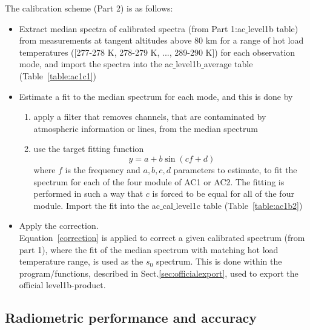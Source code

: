 The calibration scheme (Part 2) is as follows:
\begin{itemize}
\item Extract median spectra of calibrated spectra 
(from Part 1:ac\underline{ }level1b table) 
from measurements at tangent altitudes above 80 km for a range of hot load 
temperatures ([277-278 K, 278-279 K, ..., 289-290 K]) 
for each observation mode, and import the spectra
into the ac\underline{ }level1b\underline{ }average table
(Table~\ref{table:ac1c1})
\item Estimate a fit to the median spectrum for each mode, and this is done
by
\begin{enumerate}
\item apply a filter that removes channels, that are contaminated by 
atmospheric information or lines, from the median spectrum 
\item use the target fitting function  
\begin{equation}
y=a+ b\sin(cf+d)
\end{equation}
where \(f\) is the frequency and \(a,b,c,d\) parameters to estimate,
to fit the spectrum for each of the four module of AC1 or AC2.
The fitting is performed in such a way that \(c\) is forced 
to be equal for all of the four module. 
Import the fit into the ac\underline{ }cal\underline{ }level1c
table (Table~\ref{table:ac1b2})
\end{enumerate}
\item Apply the correction.\\
Equation~\ref{correction} is applied to correct a given calibrated 
spectrum (from part 1), where the fit of the median spectrum
with matching hot load temperature range, is used as the \(s_{0}\)
spectrum. 
This is done within the program/functions, described in
Sect.\ref{sec:officialexport}, used to export the official
level1b-product.  
\end{itemize}



\subsection{Radiometric performance and accuracy}
\label{sec:radper}

